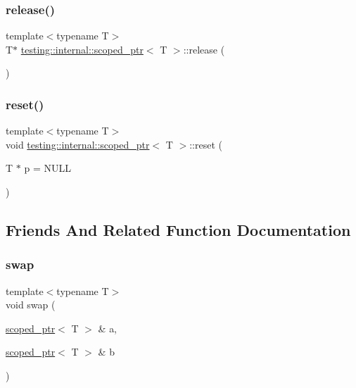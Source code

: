 \subsubsection{\texorpdfstring{release()}{release()}}
{\footnotesize\ttfamily template$<$typename T$>$ \\
T$\ast$ \mbox{\hyperlink{classtesting_1_1internal_1_1scoped__ptr}{testing\+::internal\+::scoped\+\_\+ptr}}$<$ T $>$\+::release (\begin{DoxyParamCaption}{ }\end{DoxyParamCaption})\hspace{0.3cm}{\ttfamily [inline]}}

\mbox{\label{classtesting_1_1internal_1_1scoped__ptr_acac03266a43359801aff0de5c990bec0}} 
\subsubsection{\texorpdfstring{reset()}{reset()}}
{\footnotesize\ttfamily template$<$typename T$>$ \\
void \mbox{\hyperlink{classtesting_1_1internal_1_1scoped__ptr}{testing\+::internal\+::scoped\+\_\+ptr}}$<$ T $>$\+::reset (\begin{DoxyParamCaption}\item[{T $\ast$}]{p = {\ttfamily NULL} }\end{DoxyParamCaption})\hspace{0.3cm}{\ttfamily [inline]}}



\subsection{Friends And Related Function Documentation}
\mbox{\label{classtesting_1_1internal_1_1scoped__ptr_a01bc0441e6a3ebf26807ac523392ca86}} 
\subsubsection{\texorpdfstring{swap}{swap}}
{\footnotesize\ttfamily template$<$typename T$>$ \\
void swap (\begin{DoxyParamCaption}\item[{\mbox{\hyperlink{classtesting_1_1internal_1_1scoped__ptr}{scoped\+\_\+ptr}}$<$ T $>$ \&}]{a,  }\item[{\mbox{\hyperlink{classtesting_1_1internal_1_1scoped__ptr}{scoped\+\_\+ptr}}$<$ T $>$ \&}]{b }\end{DoxyParamCaption})\hspace{0.3cm}{\ttfamily [friend]}}




